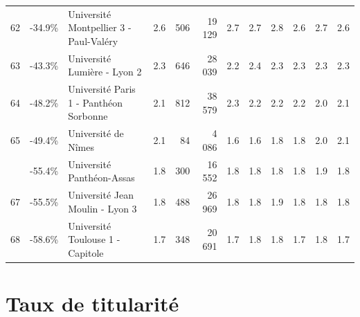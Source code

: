 \documentclass[12pt,french,landscape]{article}
\begin{document}
\begin{longtable}{rrlrrrrrrlrr}
62 & -34.9\% & Université Montpellier 3 - Paul-Valéry & 2.6 & 506 & 19 129 & 2.7 & 2.7 & 2.8 & 2.6 & 2.7 & 2.6\\
\rowcolor{gray!6}  63 & -43.3\% & Université Lumière - Lyon 2 & 2.3 & 646 & 28 039 & 2.2 & 2.4 & 2.3 & 2.3 & 2.3 & 2.3\\
64 & -48.2\% & Université Paris 1 - Panthéon Sorbonne & 2.1 & 812 & 38 579 & 2.3 & 2.2 & 2.2 & 2.2 & 2.0 & 2.1\\
\rowcolor{gray!6}  65 & -49.4\% & Université de Nîmes & 2.1 & 84 & 4 086 & 1.6 & 1.6 & 1.8 & 1.8 & 2.0 & 2.1\\
\addlinespace
66 & -55.4\% & Université Panthéon-Assas & 1.8 & 300 & 16 552 & 1.8 & 1.8 & 1.8 & 1.8 & 1.9 & 1.8\\
\rowcolor{gray!6}  67 & -55.5\% & Université Jean Moulin - Lyon 3 & 1.8 & 488 & 26 969 & 1.8 & 1.8 & 1.9 & 1.8 & 1.8 & 1.8\\
68 & -58.6\% & Université Toulouse 1 - Capitole & 1.7 & 348 & 20 691 & 1.7 & 1.8 & 1.8 & 1.7 & 1.8 & 1.7\\*
\end{longtable}

\newpage

\hypertarget{taux-de-titularituxe9}{%
\section{Taux de titularité}\label{taux-de-titularituxe9}}
\end{document}
